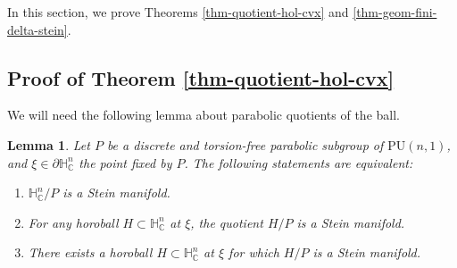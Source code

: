 \documentclass{article}
\newtheorem{lemma}[theorem]{Lemma}
\theoremstyle{definition}
\theoremstyle{remark}
\newcommand{\C}{\mathbb{C}}
\newcommand{\HNC}{\mathbb{H}^{n}_{\C}}
\newcommand{\PHNC}{\partial\mathbb{H}^{n}_{\C}}
\newcommand{\PU}{\mathrm{PU}}
\begin{document}
	In this section, we prove Theorems \ref{thm-quotient-hol-cvx} and \ref{thm-geom-fini-delta-stein}.
	
	\subsection{Proof of Theorem \ref{thm-quotient-hol-cvx}}
	
	We will need the following lemma about parabolic quotients of the ball.
	
	\begin{lemma}\label{lem-quotient-horoboule-stein}
		Let $P$ be a discrete and torsion-free parabolic subgroup of $\PU(n,1)$, and $\xi\in \PHNC$ the point fixed by $P$. The following statements are equivalent:
		\begin{enumerate}
			\item $\HNC/P$ is a Stein manifold.
			\item For any horoball $H\subset \HNC$ at $\xi$, the quotient $H/P$ is a Stein manifold.
			\item There exists a horoball $H\subset \HNC$ at $\xi$ for which $H/P$ is a Stein manifold.
		\end{enumerate}
	\end{lemma}
	
\end{document}
